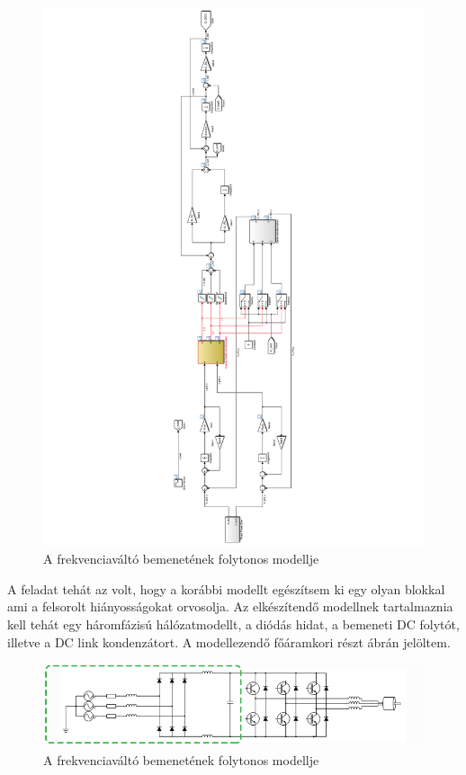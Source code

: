 \begin{figure}[]
	\centering
	\includegraphics[width = \textwidth]{figures/model_continous.pdf}
	\caption{A frekvenciaváltó bemenetének folytonos modellje} 
	\label{fig:cont_input_model}
\end{figure}

A feladat tehát az volt, hogy a korábbi modellt egészítsem ki egy olyan blokkal ami a felsorolt hiányosságokat orvosolja. Az elkészítendő modellnek tartalmaznia kell tehát egy háromfázisú hálózatmodellt, a diódás hidat, a bemeneti DC folytót, illetve a DC link kondenzátort. A modellezendő főáramkori részt  ábrán jelöltem. 

\begin{figure}[H!]
	\centering
	\includegraphics[width = \textwidth]{figures/VFDschematic_choke_marked.png}
	\caption{A frekvenciaváltó bemenetének folytonos modellje} 
	\label{fig:input_marked}
\end{figure}

